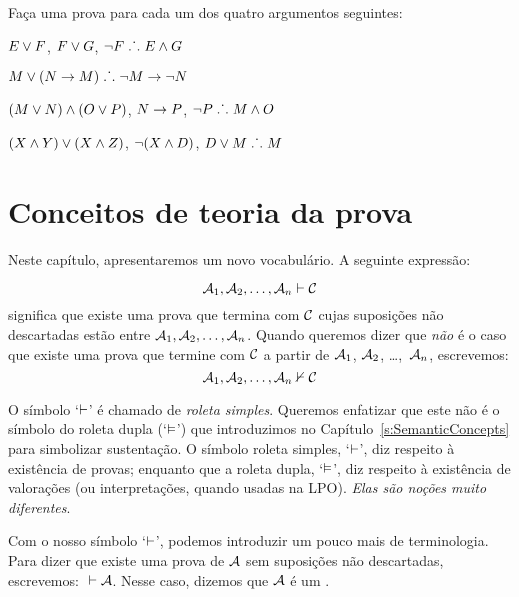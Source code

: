 \problempart 
Faça uma prova para cada um dos quatro argumentos seguintes:
\begin{earg}
\item $E\vee F$, $F\vee G$, $\neg F \mathrel{\ldotp\dot{}\,\ldotp} E \wedge G$
\item $M\vee(N\rightarrow M) \mathrel{\ldotp\dot{}\,\ldotp} \neg M \rightarrow \neg N$
\item $(M \vee N) \wedge (O \vee P)$, $N \rightarrow P$, $\neg P \mathrel{\ldotp\dot{}\,\ldotp} M\wedge O$
\item $(X\wedge Y)\vee(X\wedge Z)$, $\neg(X\wedge D)$, $D\vee M \mathrel{\ldotp\dot{}\,\ldotp} M$
\end{earg}


\chapter{Conceitos de teoria da prova}\label{s:ProofTheoreticConcepts}

 Neste capítulo, apresentaremos um novo vocabulário. A seguinte expressão:
 
$$\mathcal{A}_1, \mathcal{A}_2, \ldots, \mathcal{A}_n \vdash \mathcal{C}$$
significa que existe uma prova que termina com $\mathcal{C}$  cujas suposições não descartadas estão entre $\mathcal{A}_1, \mathcal{A}_2, \ldots, \mathcal{A}_n$. Quando queremos dizer que  \emph{não} é o caso que existe uma prova que termine com $\mathcal{C}$ a partir de $\mathcal{A}_1$, $\mathcal{A}_2$, \dots,~$\mathcal{A}_n$, escrevemos:  $$\mathcal{A}_1, \mathcal{A}_2, \ldots, \mathcal{A}_n \nvdash \mathcal{C}$$  

O símbolo `$\vdash$'  é chamado de  \emph{roleta simples}. Queremos enfatizar que este não é o símbolo do roleta dupla (`$\vDash$') que introduzimos no Capítulo~\ref{s:SemanticConcepts}  para simbolizar sustentação. O símbolo roleta simples, `$\vdash$', diz respeito à existência de provas; enquanto que a roleta dupla, `$\vDash$', diz respeito à existência de valorações (ou interpretações, quando usadas na LPO). \emph{Elas são noções muito diferentes}.

Com o nosso símbolo  `$\vdash$',  podemos introduzir um pouco mais de terminologia. Para dizer que existe uma prova de $\mathcal{A}$ sem suposições não descartadas, escrevemos: ${} \vdash \mathcal{A}$. Nesse caso, dizemos que $\mathcal{A}$ é um .

